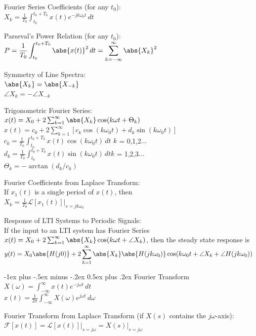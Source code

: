 \documentclass[12pt,landscape,letterpaper]{article}
\makeatletter
\renewcommand{\section}{\@startsection{section}{1}{0mm}%
                                {-1ex plus -.5ex minus -.2ex}%
                                {0.5ex plus .2ex}%
                                {\normalfont\normalsize\bfseries}}
\newcommand{\tab}{\hspace{0.02\textwidth}}
\newcommand{\ds}{\displaystyle}
\makeatother
\begin{document}
\begin{multicols*}{3}
Fourier Series Coefficients (for any $t_0$):\\
\tab $\ds X_k = \frac{1}{T_0}\int_{t_0}^{t_0 + T_0}x(t)e^{-jk\omega_0t}\,dt$

Parseval's Power Relation (for any $t_0$):\\
\tab $\ds P = \frac{1}{T_0} \int_{t_0}^{t_0 + T_0}\abs{x(t)}^2\,dt = \sum_{k = -\infty}^{\infty}\abs{X_k}^2$

Symmetry of Line Spectra:\\
\tab $\abs{X_k} = \abs{X_{-k}}$\\
\tab $\angle X_k = -\angle X_{-k}$

Trigonometric Fourier Series:\\
\tab $x(t) = X_0 + 2\sum_{k = 1}^{\infty}\abs{X_k}\cos(k\omega t + \Theta_k)$\\
\tab $x(t) = c_0 + 2\sum_{k = 1}^{\infty}[c_k\cos(k\omega_0 t) + d_k\sin(k\omega_0 t)]$\\
\tab $c_k = \frac{1}{T_0} \int_{t_0}^{t_0 + T_0}x(t)\cos(k\omega_0 t)\,dt$ \quad $k$ = 0,1,2$\ldots$\\
\tab $d_k = \frac{1}{T_0} \int_{t_0}^{t_0 + T_0}x(t)\sin(k\omega_0 t)\,dt$\quad $k$ = 1,2,3$\ldots$\\
\tab $\Theta_k = -\arctan(d_k/c_k)$


Fourier Coefficients from Laplace Transform:\\
\tab If $x_1(t)$ is a single period of $x(t)$, then\\
\tab $X_k = \frac{1}{T_0}\mathcal{L}[x_1(t)] \big\rvert_{s = jk\omega_0}$

Response of LTI Systems to Periodic Signals:\\
\tab If the input to an LTI system has Fourier Series $x(t) = X_0 + 2\sum_{k=1}^{\infty}\abs{X_k}\cos(k\omega t + \angle X_k)$, then the steady state response is $\ds y(t) = X_0\abs{H(j0)} + 2\sum_{k=1}^{\infty}\abs{X_k}\abs{H(jk\omega_0)}\cos(k\omega_0 t + \angle X_k + \angle H(jk\omega_0))$

\section{Fourier Transform}
\tab $X(\omega) = \int_{-\infty}^{\infty}x(t)e^{-j\omega t}\,dt$\\
\tab $x(t) = \frac{1}{2\pi}\int_{-\infty}^{\infty}X(\omega)e^{j\omega t}\,d\omega$

Fourier Transform from Laplace Transform (if $X(s)$ contains the $j\omega$-axis):\\
\tab $\mathcal{F}[x(t)] = \mathcal{L}[x(t)]\big\rvert_{s = j\omega} = X(s)\big\rvert_{s = j\omega}$


\end{multicols*}
\end{document}
